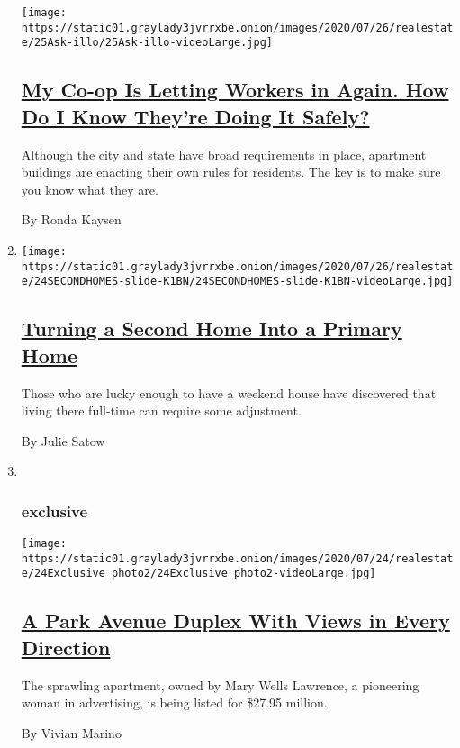 \begin{enumerate}
  \texttt{[image: https://static01.graylady3jvrrxbe.onion/images/2020/07/26/realestate/25Ask-illo/25Ask-illo-videoLarge.jpg]}

  \hypertarget{my-co-op-is-letting-workers-in-again-how-do-i-know-theyre-doing-it-safely}{%
  \subsection{\texorpdfstring{\href{/2020/07/25/realestate/coronavirus-reopening-workers-in-buildings-rules.html}{My
  Co-op Is Letting Workers in Again. How Do I Know They're Doing It
  Safely?}}{My Co-op Is Letting Workers in Again. How Do I Know They're Doing It Safely?}}\label{my-co-op-is-letting-workers-in-again-how-do-i-know-theyre-doing-it-safely}}

  Although the city and state have broad requirements in place,
  apartment buildings are enacting their own rules for residents. The
  key is to make sure you know what they are.

  By Ronda Kaysen
\item
  \texttt{[image: https://static01.graylady3jvrrxbe.onion/images/2020/07/26/realestate/24SECONDHOMES-slide-K1BN/24SECONDHOMES-slide-K1BN-videoLarge.jpg]}

  \hypertarget{turning-a-second-home-into-a-primary-home}{%
  \subsection{\texorpdfstring{\href{/2020/07/24/realestate/coronavirus-second-homes-.html}{Turning
  a Second Home Into a Primary
  Home}}{Turning a Second Home Into a Primary Home}}\label{turning-a-second-home-into-a-primary-home}}

  Those who are lucky enough to have a weekend house have discovered
  that living there full-time can require some adjustment.

  By Julie Satow
\item ~
  \hypertarget{exclusive}{%
  \subsubsection{exclusive}\label{exclusive}}

  \texttt{[image: https://static01.graylady3jvrrxbe.onion/images/2020/07/24/realestate/24Exclusive\_photo2/24Exclusive\_photo2-videoLarge.jpg]}

  \hypertarget{a-park-avenue-duplex-with-views-in-every-direction}{%
  \subsection{\texorpdfstring{\href{/2020/07/24/realestate/a-park-avenue-duplex-with-views-in-every-direction.html}{A
  Park Avenue Duplex With Views in Every
  Direction}}{A Park Avenue Duplex With Views in Every Direction}}\label{a-park-avenue-duplex-with-views-in-every-direction}}

  The sprawling apartment, owned by Mary Wells Lawrence, a pioneering
  woman in advertising, is being listed for \$27.95 million.

  By Vivian Marino
\end{enumerate}

